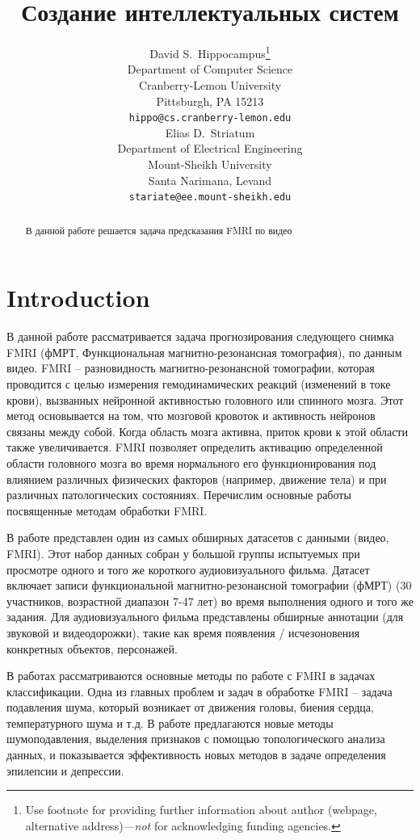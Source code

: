 \documentclass{article}
\title{Создание интеллектуальных систем}
\author{ David S.~Hippocampus\thanks{Use footnote for providing further
		information about author (webpage, alternative
		address)---\emph{not} for acknowledging funding agencies.} \\
	Department of Computer Science\\
	Cranberry-Lemon University\\
	Pittsburgh, PA 15213 \\
	\texttt{hippo@cs.cranberry-lemon.edu} \\
	\And
	Elias D.~Striatum \\
	Department of Electrical Engineering\\
	Mount-Sheikh University\\
	Santa Narimana, Levand \\
	\texttt{stariate@ee.mount-sheikh.edu} \\
}
\date{}
\begin{document}
\maketitle

\begin{abstract}
	В данной работе решается задача предсказания FMRI по видео
\end{abstract}



\section{Introduction}

В данной работе рассматривается задача прогнозирования следующего снимка FMRI (фМРТ, Функциональная магнитно-резонансная томография), по данным видео. FMRI – разновидность магнитно-резонансной томографии, которая проводится с целью измерения гемодинамических реакций (изменений в токе крови), вызванных нейронной активностью головного или спинного мозга. Этот метод основывается на том, что мозговой кровоток и активность нейронов связаны между собой. Когда область мозга активна, приток крови к этой области также увеличивается. FMRI позволяет определить активацию определенной области головного мозга во время нормального его функционирования под влиянием различных физических факторов (например, движение тела) и при различных патологических состояниях. Перечислим основные работы посвященные методам обработки FMRI.

В работе \cite{dataset} представлен один из самых обширных датасетов с данными (видео, FMRI).  Этот набор данных собран у большой группы испытуемых при просмотре одного и того же короткого аудиовизуального фильма. Датасет включает записи функциональной магнитно-резонансной томографии (фМРТ) (30 участников, возрастной диапазон 7-47 лет) во время выполнения одного и того же задания. Для аудиовизуального фильма представлены обширные аннотации (для звуковой и видеодорожки), такие как время появления / исчезоновения конкретных объектов, персонажей.

В работах \cite{fmri2} рассматриваются основные методы по работе с FMRI в задачах классификации. Одна из главных проблем и задач в обработке FMRI -- задача подавления шума, который возникает от движения головы, биения сердца, температурного шума и т.д. В работе предлагаются новые методы шумоподавления, выделения признаков с помощью топологического анализа данных, и показывается эффективность новых методов в задаче определения эпилепсии и депрессии.
\end{document}
